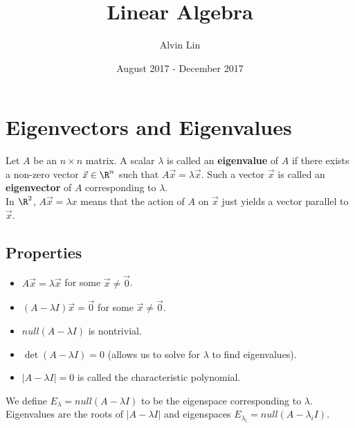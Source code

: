 \documentclass[letterpaper, 12pt]{math}
\title{Linear Algebra}
\author{Alvin Lin}
\date{August 2017 - December 2017}
\begin{document}
\maketitle

\section*{Eigenvectors and Eigenvalues}
Let \( A \) be an \( n\times n \) matrix. A scalar \( \lambda \) is called an
\textbf{eigenvalue} of \( A \) if there exists a non-zero vector \( \vec{x}\in
\R^n \) such that \( A\vec{x} = \lambda\vec{x} \). Such a vector \( \vec{x} \)
is called an \textbf{eigenvector} of \( A \) corresponding to \( \lambda \). \\
In \( \R^2 \), \( A\vec{x} = \lambda x \) means that the action of \( A \) on
\( \vec{x} \) just yields a vector parallel to \( \vec{x} \).

\subsection*{Properties}
\begin{itemize}
  \item \( A\vec{x} = \lambda\vec{x} \) for some \( \vec{x}\ne\vec{0} \).
  \item \( (A-\lambda I)\vec{x} = \vec{0} \) for some \( \vec{x}\ne\vec{0} \).
  \item \( null(A-\lambda I) \) is nontrivial.
  \item \( \det(A-\lambda I) = 0 \) (allows us to solve for \( \lambda \) to
  find eigenvalues).
  \item \( |A-\lambda I| = 0 \) is called the characteristic polynomial.
\end{itemize}
We define \( E_{\lambda} = null(A-\lambda I) \) to be the eigenspace
corresponding to \( \lambda \). Eigenvalues are the roots of \( |A-\lambda I| \)
and eigenspaces \( E_{\lambda_i} = null(A-\lambda_iI) \).
\end{document}
